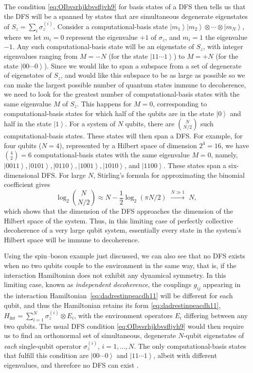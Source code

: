 \documentclass[3p,sort&compress,12pt]{elsarticle}
\newcommand{\ket}[1]{\left\vert{#1}\right\rangle}
\newcommand{\op}[1]{#1}
\begin{document}
The condition \eqref{eq:OIbvsrhjkbvsfljvh9} for basis states of a DFS then tells us that the DFS will be a spanned by states that are simultaneous degenerate eigenstates of $\op{S}_z=\sum_i \op{\sigma}_z^{(i)}$. Consider a computational-basis state $\ket{m_1}\ket{m_2} \otimes \cdots \otimes \ket{m_N}$, where we let $m_i=0$ represent the eigenvalue $+1$ of $\op{\sigma}_z$, and $m_i=1$ the eigenvalue $-1$. Any such computational-basis state will be an eigenstate of $\op{S}_z$, with integer eigenvalues ranging from $M=-N$ (for the state $\ket{11\cdots 1}$) to $M=+N$ (for the state $\ket{00\cdots 0}$). Since we would like to span a subspace from a set of degenerate of eigenstates of $\op{S}_z$, and would like this subspace to be as large as possible so we can make the largest possible number of quantum states immune to decoherence, we need to look for the greatest number of computational-basis states with the same eigenvalue $M$ of $\op{S}_z$. This happens for $M=0$, corresponding to computational-basis states for which half of the qubits are in the state $\ket{0}$ and half in the state $\ket{1}$. For a system of $N$ qubits, there are $\binom{N}{N/2}$ such computational-basis states. These states will then span a DFS. For example, for four qubits ($N=4$), represented by a Hilbert space of dimension $2^4=16$, we have $\binom{4}{2}=6$ computational-basis states with the same eigenvalue $M=0$, namely, $\ket{0011}, \ket{0101}, \ket{0110}, \ket{1001}, \ket{1010}$, and $\ket{1100}$. These states span a six-dimensional DFS. For large $N$, Stirling's formula for approximating the binomial coefficient gives 
%
\begin{equation}
 \log_2 \binom{N}{N/2} \approx N - \frac{1}{2} \log_2 (\pi N/2) \,\,
 \xrightarrow{N \gg 1} \,\, N,
\end{equation}
%
which shows that the dimension of the DFS approaches the dimension of the Hilbert space of the system. Thus, in this limiting case of perfectly collective decoherence of a very large qubit system, essentially every state in the system's Hilbert space will be immune to decoherence. 

Using the spin--boson example just discussed, we can also see that no DFS exists when no two qubits couple to the environment in the same way, that is, if the interaction Hamiltonian does not exhibit any dynamical symmetry. In this limiting case, known as \emph{independent decoherence}, the couplings $g_{ij}$ appearing in the interaction Hamiltonian~\eqref{eq:dadrestinpeacdh11} will be different for each qubit, and thus the Hamiltonian retains its form \eqref{eq:dadrestinpeacdh11}, $\op{H}_\text{int}  =  \sum_{i=1}^N  \sigma_z^{(i)} \otimes E_i$, with the environment operators $E_i$ differing between any two qubits. The usual DFS condition \eqref{eq:OIbvsrhjkbvsfljvh9} would then require us to find an orthonormal set of simultaneous, degenerate $N$-qubit eigenstates of \emph{each} single-qubit operator $\sigma_z^{(i)}$, $i=1,\hdots,N$. The only computational-basis states that fulfill this condition are $\ket{00\cdots 0}$ and $\ket{11\cdots 1}$, albeit with different eigenvalues, and therefore no DFS can exist \cite{Lidar:1998:uu}. 
\end{document}
